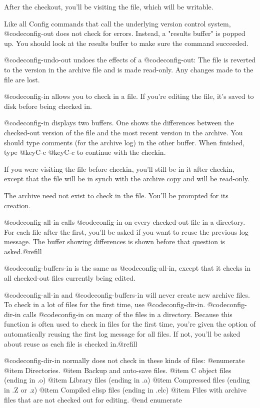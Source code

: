 After the checkout, you'll be visiting the file, which will be
writable.

Like all Config commands that call the underlying version control
system, @code{config-out} does not check for errors.  Instead, a
"results buffer" is popped up.  You should look at the results buffer
to make sure the command succeeded.

@code{config-undo-out} undoes the effects of a @code{config-out}: The
file is reverted to the version in the archive file and is made
read-only. Any changes made to the file are lost.

@code{config-in} allows you to check in a file.  If you're editing the
file, it's saved to disk before being checked in.

@code{config-in} displays two buffers.  One shows the differences between
the checked-out version of the file and the most recent version in the
archive. You should type comments (for the archive log) in the other
buffer.  When finished, type @key{C-c} @key{C-c} to continue with the checkin.

If you were visiting the file before checkin, you'll still be in it
after checkin, except that the file will be in synch with the archive
copy and will be read-only.

The archive need not exist to check in the file.  You'll be prompted
for its creation.

@code{config-all-in} calls @code{config-in} on every checked-out file
in a directory.  For each file after the first, you'll be asked if you
want to reuse the previous log message.  The buffer showing
differences is shown before that question is asked.@refill

@code{config-buffers-in} is the same as @code{config-all-in}, except
that it checks in all checked-out files currently being edited.

@code{config-all-in} and @code{config-buffers-in} will never create
new archive files.  To check in a lot of files for the first time, use
@code{config-dir-in}.  @code{config-dir-in} calls @code{config-in} on
many of the files in a directory.  Because this function is often used
to check in files for the first time, you're given the option of
automatically reusing the first log message for all files.  If not,
you'll be asked about reuse as each file is checked in.@refill

@code{config-dir-in} normally does not check in these kinds of files:
@enumerate
@item
Directories.
@item
Backup and auto-save files.
@item
C object files (ending in .o)
@item
Library files (ending in .a)
@item
Compressed files (ending in .Z or .z)
@item
Compiled elisp files (ending in .elc)
@item
Files with archive files that are not checked out for editing.
@end enumerate

